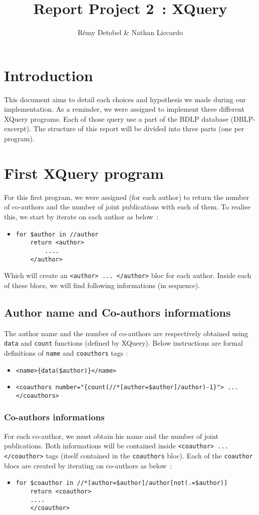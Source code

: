 \documentclass{article}
\author{R\'emy Detobel \& Nathan Liccardo}
\title{Report Project 2~: XQuery}
\begin{document}
\maketitle

\section{Introduction}
This document aims to detail each choices and hypothesis we made during our implementation. As a reminder, we were assigned to implement three different XQuery programs. Each of those query use a part of the BDLP database (DBLP-excerpt). The structure of this report will be divided into three parts (one per program).

\section{First XQuery program}
For this first program, we were assigned (for each author) to return the number of co-authors and the number of joint publications with each of them. To realise this, we start by iterate on each author as below~: 
\begin{itemize}
\item \begin{verbatim}
for $author in //author
    return <author>
        ....
    </author>    
\end{verbatim}
\end{itemize}
Which will create an \verb|<author> ... </author>| bloc for each author. Inside each of these blocs, we will find following informations (in sequence).
\subsection{Author name and Co-authors informations}
The author name and the number of co-authors are respectively obtained using \verb|data| and \verb|count| functions (defined by XQuery). Below instructions are formal definitions of \verb|name| and \verb|coauthors| tags :
\begin{itemize}
\item \verb|<name>{data($author)}</name>|
\item \verb|<coauthors number="{count(//*[author=$author]/author)-1}"> ... </coauthors>|
\end{itemize}
\subsubsection{Co-authors informations}
For each co-author, we must obtain his name and the number of joint publications. Both informations will be contained inside \verb|<coauthor> ... </coauthor>| tags (itself contained in the \verb|coauthors| bloc). Each of the \verb|coauthor| blocs are created by iterating on co-authors as below~:
\begin{itemize}
\item \begin{verbatim}
for $coauthor in //*[author=$author]/author[not(.=$author)]
    return <coauthor>
    ....
    </coauthor>
\end{verbatim}
\end{itemize}
\end{document}
